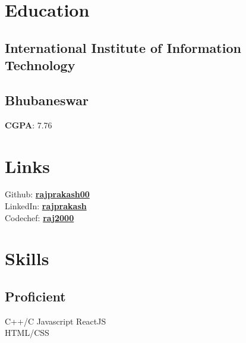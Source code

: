 \documentclass[]{deedy-resume-openfont}
\begin{document}
%
%

%
%

\begin{minipage}[t]{0.33\textwidth} 


\section{Education} 

\subsection{International Institute of
Information Technology}
\subsection{Bhubaneswar}
\textbf{CGPA}: 7.76
\sectionsep


\section{Links} 
Github: \href{https://github.com/rajprakash00}{\bf rajprakash00} \\
LinkedIn:  \href{https://www.linkedin.com/in/rajprakash-sahoo-7597a216a/}{\bf rajprakash} \\
Codechef: \href{https://codechef.com/users/raj2000}{\bf raj2000}



\section{Skills}
\subsection{Proficient}
C++/C \textbullet{}   Javascript \textbullet{} ReactJS \\
HTML/CSS
\sectionsep

\end{minipage}
\end{document}
